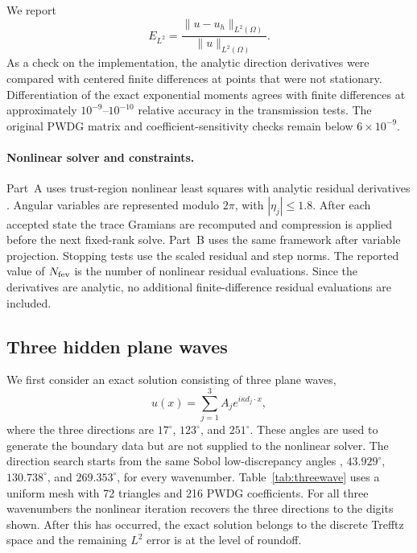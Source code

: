 \documentclass[pdflatex,sn-mathphys-num]{sn-jnl}
\theoremstyle{thmstyleone}
\theoremstyle{thmstyletwo}
\begin{document}
We report
\[
 E_{L^2}=\frac{\|u-u_h\|_{L^2(\Omega)}}{\|u\|_{L^2(\Omega)}}.
\]
As a check on the implementation, the analytic direction derivatives were compared with centered finite differences at points that were not stationary.  Differentiation of the exact exponential moments agrees with finite differences at approximately $10^{-9}$--$10^{-10}$ relative accuracy in the transmission tests.  The original PWDG matrix and coefficient-sensitivity checks remain below $6\times10^{-9}$.


\paragraph{Nonlinear solver and constraints.}
Part~A uses trust-region nonlinear least squares with analytic residual derivatives \cite{More1978}.  Angular variables are represented modulo $2\pi$, with $|\eta_j|\le1.8$.  After each accepted state the trace Gramians are recomputed and compression is applied before the next fixed-rank solve.  Part~B uses the same framework after variable projection.  Stopping tests use the scaled residual and step norms.  The reported value of $N_{\rm fev}$ is the number of nonlinear residual evaluations.  Since the derivatives are analytic, no additional finite-difference residual evaluations are included.

\subsection{Three hidden plane waves}\label{subsec:threewave}
We first consider an exact solution consisting of three plane waves,
\begin{equation}\label{eq:threewave}
 u(x)=\sum_{j=1}^3A_j e^{i\kappa d_j\cdot x},
\end{equation}
where the three directions are $17^\circ$, $123^\circ$, and $251^\circ$.  These angles are used to generate the boundary data but are not supplied to the nonlinear solver.  The direction search starts from the same Sobol low-discrepancy angles \cite{Sobol1967}, $43.929^\circ$, $130.738^\circ$, and $269.353^\circ$, for every wavenumber.  Table~\ref{tab:threewave} uses a uniform mesh with 72 triangles and 216 PWDG coefficients.  For all three wavenumbers the nonlinear iteration recovers the three directions to the digits shown.  After this has occurred, the exact solution belongs to the discrete Trefftz space and the remaining $L^2$ error is at the level of roundoff.
\end{document}

